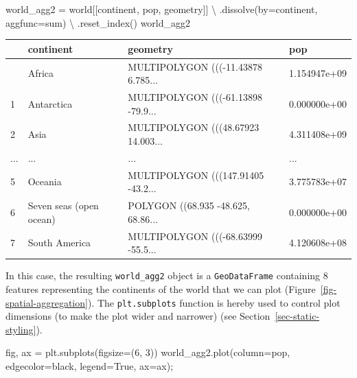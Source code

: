 \documentclass[
  letterpaper,
]{krantz}
\newenvironment{Shaded}{\begin{snugshade}}{\end{snugshade}}
\newcommand{\DecValTok}[1]{\textcolor[rgb]{0.68,0.00,0.00}{#1}}
\newcommand{\NormalTok}[1]{\textcolor[rgb]{0.00,0.23,0.31}{#1}}
\newcommand{\OperatorTok}[1]{\textcolor[rgb]{0.37,0.37,0.37}{#1}}
\newcommand{\StringTok}[1]{\textcolor[rgb]{0.13,0.47,0.30}{#1}}
\newcommand{\VariableTok}[1]{\textcolor[rgb]{0.07,0.07,0.07}{#1}}
\begin{document}
\begin{Shaded}
\begin{Highlighting}[]
\NormalTok{world\_agg2 }\OperatorTok{=}\NormalTok{ world[[}\StringTok{\textquotesingle{}continent\textquotesingle{}}\NormalTok{, }\StringTok{\textquotesingle{}pop\textquotesingle{}}\NormalTok{, }\StringTok{\textquotesingle{}geometry\textquotesingle{}}\NormalTok{]] }\OperatorTok{\textbackslash{}}
\NormalTok{    .dissolve(by}\OperatorTok{=}\StringTok{\textquotesingle{}continent\textquotesingle{}}\NormalTok{, aggfunc}\OperatorTok{=}\StringTok{\textquotesingle{}sum\textquotesingle{}}\NormalTok{) }\OperatorTok{\textbackslash{}}
\NormalTok{    .reset\_index()}
\NormalTok{world\_agg2}
\end{Highlighting}
\end{Shaded}

\begin{longtable}[]{@{}llll@{}}
\toprule\noalign{}
& continent & geometry & pop \\
\midrule\noalign{}
\endhead
\bottomrule\noalign{}
\endlastfoot
0 & Africa & MULTIPOLYGON (((-11.43878 6.785... & 1.154947e+09 \\
1 & Antarctica & MULTIPOLYGON (((-61.13898 -79.9... & 0.000000e+00 \\
2 & Asia & MULTIPOLYGON (((48.67923 14.003... & 4.311408e+09 \\
... & ... & ... & ... \\
5 & Oceania & MULTIPOLYGON (((147.91405 -43.2... & 3.775783e+07 \\
6 & Seven seas (open ocean) & POLYGON ((68.935 -48.625, 68.86... &
0.000000e+00 \\
7 & South America & MULTIPOLYGON (((-68.63999 -55.5... & 4.120608e+08 \\
\end{longtable}

In this case, the resulting \texttt{world\_agg2} object is a
\texttt{GeoDataFrame} containing 8 features representing the continents
of the world that we can plot (Figure~\ref{fig-spatial-aggregation}).
The \texttt{plt.subplots} function is hereby used to control plot
dimensions (to make the plot wider and narrower) (see
Section~\ref{sec-static-styling}).

\begin{Shaded}
\begin{Highlighting}[]
\NormalTok{fig, ax }\OperatorTok{=}\NormalTok{ plt.subplots(figsize}\OperatorTok{=}\NormalTok{(}\DecValTok{6}\NormalTok{, }\DecValTok{3}\NormalTok{))}
\NormalTok{world\_agg2.plot(column}\OperatorTok{=}\StringTok{\textquotesingle{}pop\textquotesingle{}}\NormalTok{, edgecolor}\OperatorTok{=}\StringTok{\textquotesingle{}black\textquotesingle{}}\NormalTok{, legend}\OperatorTok{=}\VariableTok{True}\NormalTok{, ax}\OperatorTok{=}\NormalTok{ax)}\OperatorTok{;}
\end{Highlighting}
\end{Shaded}
\end{document}

